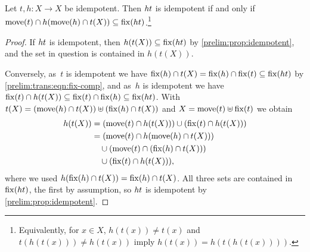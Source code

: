 \begin{corollary} \label{prelim:cor:comp-idempotents-idempotent}
	Let $t, h \colon X \to X$ be idempotent.
	Then $\concat{t}{h}$ is idempotent if and only if
	$\move{t} \cap h(\move{h} \cap t(X)) \subseteq \fix{\concat{t}{h}}$.\footnote{Equivalently,
		for $x \in X$, $h(t(x)) \ne t(x)$ and $t(h(t(x))) \ne h(t(x))$ imply
		$h(t(x)) = h(t(h(t(x))))$.}
\end{corollary}
\begin{proof}
	If $\concat{t}{h}$ is idempotent, then $h(t(X)) \subseteq \fix{\concat{t}{h}}$ by \cref{prelim:prop:idempotent},
	and the set in question is contained in $h(t(X))$.
	
	Conversely, as~$t$ is idempotent we have
	$\fix{h}\cap t(X) = \fix{h}\cap \fix{t} \subseteq \fix{\concat{t}{h}}$
	by \cref{prelim:trans:eqn:fix-comp}, and as~$h$ is idempotent we have
	$\fix{t} \cap h(t(X)) \subseteq \fix{t}\cap \fix{h} \subseteq \fix{\concat{t}{h}}$.
	With $t(X) = ( \move{h} \cap t(X) ) \uplus ( \fix{h} \cap t(X) )$ and
	$X = \move{t} \uplus \fix{t}$ we obtain
	\begin{equation*}
		\begin{aligned}
			h(t(X))
			&= (\move{t} \cap h(t(X)))
			\cup (\fix{t} \cap h(t(X))) \\
			&= (\move{t} \cap h(\move{h} \cap t(X))) \\
			&\quad \cup (\move{t} \cap (\fix{h} \cap t(X))) \\
			&\quad \cup (\fix{t} \cap h(t(X))),
		\end{aligned}
	\end{equation*}
	where we used $h(\fix{h}\cap t(X)) = \fix{h}\cap t(X)$.
	All three sets are contained in $\fix{\concat{t}{h}}$, the first by
	assumption, so $\concat{t}{h}$ is idempotent by \cref{prelim:prop:idempotent}.
\end{proof}

